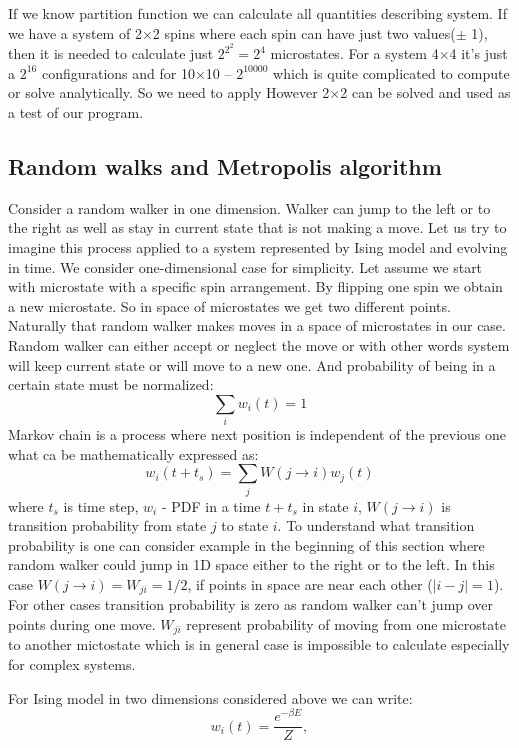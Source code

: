 \documentclass[10pt]{article}
\begin{document}
If we know partition function we can calculate all quantities describing system. If we have a system of 2$\times$2 spins where each spin can have just two values($\pm$ 1), then it is needed to calculate just $2^{2^{2}} = 2^4$ microstates. For a system 4$\times$4 it's just a $2^{16}$ configurations and for 10$\times$10 -- $2^{10000}$ which is quite complicated to compute or solve analytically. So we need to apply
However 2$\times$2 can be solved and used as a test of our program.



\subsection{Random walks and Metropolis algorithm}
Consider a random walker in one dimension. Walker can jump to the left or to the right as well as stay in current state that is not making a move. Let us try to imagine this process applied to a system represented by Ising model and evolving in time. We consider one-dimensional case for simplicity.
Let assume we start with microstate with a specific spin arrangement. By flipping one spin we obtain a new microstate. So in space of microstates we get two different points. Naturally that random walker makes moves in a space of microstates in our case.
Random walker can either accept or neglect the move or with other words system will keep
current state or will move to a new one. And probability of being in a certain state must be normalized:
\[
\sum_{i} {w_i(t)} = 1
\]
Markov chain is a process where next position is independent of the previous one what ca be mathematically expressed as:
\[
w_i(t+t_s)=\sum_{j} {W(j\rightarrow i)w_j(t)}
\]
where $t_s$ is time step, $w_i$ - PDF in a time $t+t_s$ in state $i$, $W(j\rightarrow i)$ is transition probability from state $j$ to state $i$. To understand what transition probability is one can consider example in the beginning of this section where random walker could jump in 1D space either to the right or to the left. In this case
$W(j\rightarrow i)=W_{ji}=1/2$, if points in space are near each other ($|i-j|=1$). For other cases transition probability is zero as random walker can't jump over points during one move.
$W_{ji}$ represent probability of moving from one microstate to another mictostate which is in general case is impossible to calculate especially for complex systems.


For Ising model in two dimensions considered above we can write:
\[
w_i(t) = \frac{e^{-\beta E}}{Z},
\]
\end{document}
